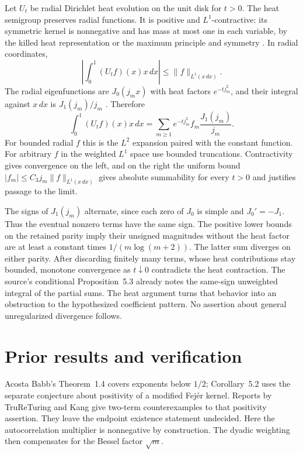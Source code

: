 \documentclass[11pt]{amsart}
\begin{document}
Let \(U_t\) be radial Dirichlet heat evolution on the unit disk
for \(t>0\). The heat semigroup preserves radial functions.
It is positive and \(L^1\)-contractive: its symmetric kernel is
nonnegative and has mass at most one in each variable, by the
killed heat representation or the maximum principle and
symmetry \cite{heat}. In radial coordinates,
\[
 \left|\int_0^1 (U_t f)(x)x\,dx\right|
     \le\|f\|_{L^1(x\,dx)} .
\]
The radial eigenfunctions are \(J_0(j_m x)\) with heat factors
\(e^{-tj_m^2}\), and their integral against \(x\,dx\) is
\(J_1(j_m)/j_m\) \cite[Eq.~(2.8)]{acosta}. Therefore
\[
       \int_0^1 (U_t f)(x)x\,dx
         =\sum_{m\ge1} e^{-tj_m^2} f_m\frac{J_1(j_m)}{j_m}.
\]
For bounded radial \(f\) this is the \(L^2\) expansion paired
with the constant function. For arbitrary \(f\) in the weighted
\(L^1\) space use bounded truncations. Contractivity gives
convergence on the left, and on the right the uniform bound
\(|f_m|\le C_3 j_m\|f\|_{L^1(x\,dx)}\) gives absolute
summability for every \(t>0\) and justifies passage to the
limit.

The signs of \(J_1(j_m)\) alternate, since each zero of \(J_0\)
is simple and \(J_0'=-J_1\). Thus the eventual nonzero terms
have the same sign. The positive lower bounds on the retained
parity imply their unsigned magnitudes without the heat factor
are at least a constant times \(1/(m\log(m+2))\). The latter
sum diverges on either parity. After discarding finitely many
terms, whose heat contributions stay bounded, monotone
convergence as \(t\downarrow0\) contradicts the heat contraction.
The source's conditional Proposition~5.3 already notes the
same-sign unweighted integral of the partial sums. The
heat argument turns that behavior into an obstruction to the
hypothesized coefficient pattern. No assertion about general
unregularized divergence follows.

\section*{Prior results and verification}
Acosta Babb's Theorem~1.4 covers exponents below \(1/2\);
Corollary~5.2 uses the separate conjecture about positivity of
a modified Fej\'er kernel. Reports by TruReTuring and Kang
\cite{tru,kang} give two-term counterexamples to that positivity
assertion. They leave the endpoint existence statement
undecided. Here the autocorrelation multiplier is nonnegative
by construction. The dyadic weighting then compensates for
the Bessel factor \(\sqrt m\).
\end{document}
